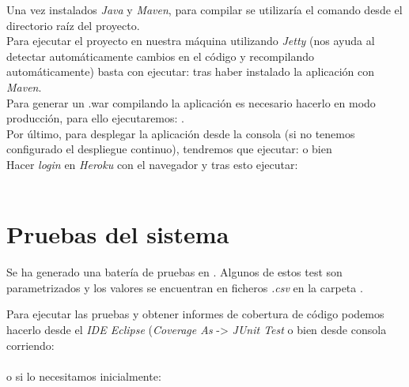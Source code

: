 Una vez instalados \textit{Java} y \textit{Maven}, para compilar se utilizaría el comando  desde el directorio raíz del proyecto.\\

Para ejecutar el proyecto en nuestra máquina utilizando \textit{Jetty} (nos ayuda al detectar automáticamente cambios en el código y recompilando automáticamente) basta con ejecutar:  tras haber instalado la aplicación con \textit{Maven}.\\

Para generar un .war compilando la aplicación es necesario hacerlo en modo producción, para ello ejecutaremos: .\\

Por último, para desplegar la aplicación desde la consola (si no tenemos configurado el despliegue continuo), tendremos que ejecutar:
 o bien \\
Hacer \textit{login} en \textit{Heroku} con el navegador y tras esto ejecutar:\\
\\

\section{Pruebas del sistema}
Se ha generado una batería de pruebas en . Algunos de estos test son parametrizados y los valores se encuentran en ficheros \textit{.csv} en la carpeta .

Para ejecutar las pruebas y obtener informes de cobertura de código podemos hacerlo desde el \textit{IDE Eclipse} (\textit{Coverage As} -> \textit{JUnit Test} o bien desde consola corriendo:\\
\\
o si lo necesitamos inicialmente:\\
